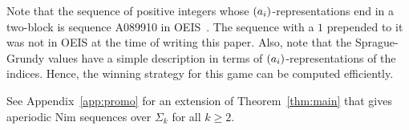 \documentclass[english,12pt]{article}
\newcommand{\seq}{\p}
\begin{document}
Note that the sequence of positive integers whose $\seq{a_i}$-representations end in a two-block is sequence A089910 in OEIS~\cite{oeis89910}.  The sequence with a $1$ prepended to it was not in OEIS at the time of writing this paper.  Also, note that the Sprague-Grundy values have a simple description in terms of $\seq{a_i}$-representations of the indices.  Hence, the winning strategy for this game can be computed efficiently.

See Appendix~\ref{app:promo} for an extension of Theorem~\ref{thm:main} that gives aperiodic Nim sequences over $\Sigma_k$ for all $k\geq2$.
\end{document}
